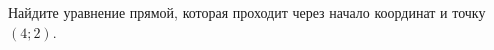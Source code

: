 \begin{ex}
	\begin{condition}
		Найдите уравнение прямой, которая проходит через начало координат и точку \( (4;2) \).
	\end{condition}
\end{ex}